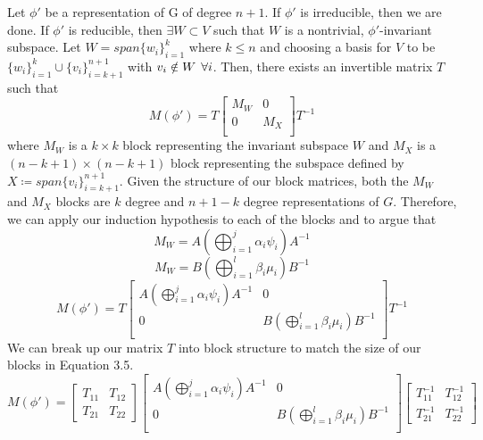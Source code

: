 \documentclass[10pt]{ucthesis}
\begin{document}
Let $\phi'$ be a representation of G of degree $n+1$. If $\phi'$ is irreducible, then we are done. If $\phi'$ is reducible, then $\exists W \subset V$ such that $W$ is a nontrivial, $\phi'$-invariant subspace. Let $W = span\{w_i\}_{i=1}^k$ where $k\leq n$ and choosing a basis for $V$ to be $\{w_i\}_{i=1}^k \cup \{v_i\}_{i=k+1}^{n+1}$ with $v_i \notin W \hspace{1.5mm} \forall i$. Then, there exists an invertible matrix $T$ such that
\begin{equation}
	M(\phi') = T\begin{bmatrix}
					M_W& 0\\
					0 & M_{X}\\
					\end{bmatrix}T^{-1}
\end{equation}
where $M_W$ is a $k\times k$ block representing the invariant subspace $W$ and $M_{X}$ is a $(n-k+1)\times (n-k+1)$ block representing the subspace defined by $X \coloneq span\{v_i\}_{i=k+1}^{n+1}$. Given the structure of our block matrices, both the $M_W$ and $M_X$ blocks are $k$ degree and $n+1-k$ degree representations of $G$. Therefore, we can apply our induction hypothesis to each of the blocks and to argue that 
$$M_W = A\left(\bigoplus_{i=1}^j \alpha_i\psi_i \right)A^{-1}$$
$$M_W = B\left(\bigoplus_{i=1}^{l} \beta_i\mu_i  \right)B^{-1}$$
\begin{equation}
	M(\phi') = T\begin{bmatrix}
					A\left(\bigoplus_{i=1}^j \alpha_i\psi_i \right)A^{-1}& 0\\
					0 &  B\left(\bigoplus_{i=1}^{l} \beta_i\mu_i  \right)B^{-1}\\
					\end{bmatrix}T^{-1}
\end{equation}
We can break up our matrix $T$ into block structure to match the size of our blocks in Equation 3.5.
\begin{equation}
	M(\phi') =  \begin{bmatrix}
					T_{11} & T_{12} \\
					T_{21} & T_{22}
				\end{bmatrix}
				\begin{bmatrix}
					A\left(\bigoplus_{i=1}^j \alpha_i\psi_i \right)A^{-1}& 0\\
					0 &  B\left(\bigoplus_{i=1}^{l} \beta_i\mu_i  \right)B^{-1}\\
				\end{bmatrix}
				\begin{bmatrix}
					T_{11}^{-1} & T_{12}^{-1} \\
					T_{21}^{-1} & T_{22}^{-1}
				\end{bmatrix}
\end{equation}
\end{document}
